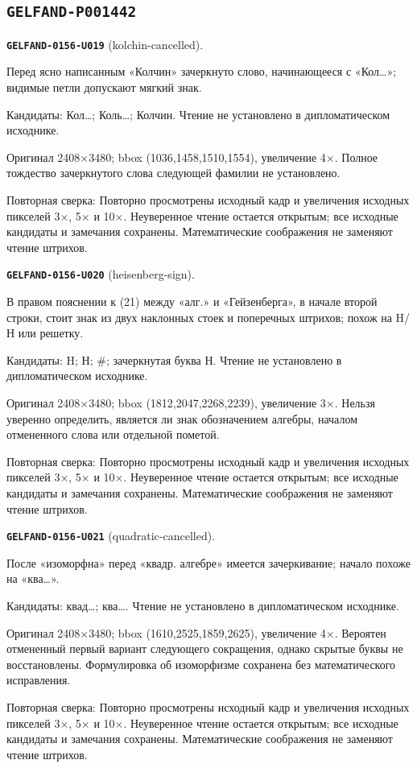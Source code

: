 \subsection*{\texttt{GELFAND-P001442}}
\par\noindent\leavevmode{}\label{GELFAND-0156-U019}\label{GELFAND-P001442:kolchin-cancelled}\textbf{\texttt{GELFAND-0156-U019}} (kolchin-cancelled).\nopagebreak[4]\par
Перед ясно написанным «Колчин» зачеркнуто слово, начинающееся с «Кол…»; видимые петли допускают мягкий знак.\par
Кандидаты: Кол…; Коль…; Колчин. Чтение не установлено в дипломатическом исходнике.\par
Оригинал 2408×3480; bbox (1036,1458,1510,1554), увеличение 4×. Полное тождество зачеркнутого слова следующей фамилии не установлено.\par
Повторная сверка: Повторно просмотрены исходный кадр и увеличения исходных пикселей 3×, 5× и 10×. Неуверенное чтение остается открытым; все исходные кандидаты и замечания сохранены. Математические соображения не заменяют чтение штрихов.\par\medskip
\par\noindent\leavevmode{}\label{GELFAND-0156-U020}\label{GELFAND-P001442:heisenberg-sign}\textbf{\texttt{GELFAND-0156-U020}} (heisenberg-sign).\nopagebreak[4]\par
В правом пояснении к (21) между «алг.» и «Гейзенберга», в начале второй строки, стоит знак из двух наклонных стоек и поперечных штрихов; похож на H/Н или решетку.\par
Кандидаты: H; Н; \#; зачеркнутая буква Н. Чтение не установлено в дипломатическом исходнике.\par
Оригинал 2408×3480; bbox (1812,2047,2268,2239), увеличение 3×. Нельзя уверенно определить, является ли знак обозначением алгебры, началом отмененного слова или отдельной пометой.\par
Повторная сверка: Повторно просмотрены исходный кадр и увеличения исходных пикселей 3×, 5× и 10×. Неуверенное чтение остается открытым; все исходные кандидаты и замечания сохранены. Математические соображения не заменяют чтение штрихов.\par\medskip
\par\noindent\leavevmode{}\label{GELFAND-0156-U021}\label{GELFAND-P001442:quadratic-cancelled}\textbf{\texttt{GELFAND-0156-U021}} (quadratic-cancelled).\nopagebreak[4]\par
После «изоморфна» перед «квадр. алгебре» имеется зачеркивание; начало похоже на «ква…».\par
Кандидаты: квад…; ква…. Чтение не установлено в дипломатическом исходнике.\par
Оригинал 2408×3480; bbox (1610,2525,1859,2625), увеличение 4×. Вероятен отмененный первый вариант следующего сокращения, однако скрытые буквы не восстановлены. Формулировка об изоморфизме сохранена без математического исправления.\par
Повторная сверка: Повторно просмотрены исходный кадр и увеличения исходных пикселей 3×, 5× и 10×. Неуверенное чтение остается открытым; все исходные кандидаты и замечания сохранены. Математические соображения не заменяют чтение штрихов.\par\medskip
